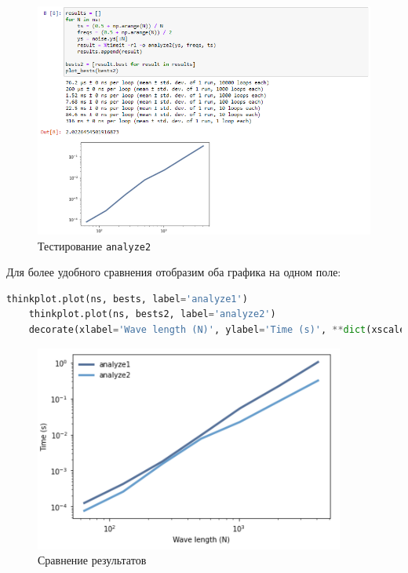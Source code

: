 \documentclass[a4paper]{article}
\begin{document}
             \begin{figure}[H]
                \centering
                \includegraphics[width=\textwidth]{ex_1_analyze2_result.png}
                \caption{Тестирование \texttt{analyze2}}
                \label{fig:ex_1_analyze2_result}
            \end{figure}
            
            Для более удобного сравнения отобразим оба графика на одном поле:
            
\begin{lstlisting}[language=Python, caption= Сравнение результатов]
    thinkplot.plot(ns, bests, label='analyze1')
    thinkplot.plot(ns, bests2, label='analyze2')
    decorate(xlabel='Wave length (N)', ylabel='Time (s)', **dict(xscale='log', yscale='log'))
\end{lstlisting}               
            
            \begin{figure}[H]
                \centering
                \includegraphics{ex_1_comparison .png}
                \caption{Сравнение результатов}
                \label{fig:ex_1_comparison}
            \end{figure}
            
\end{document}
